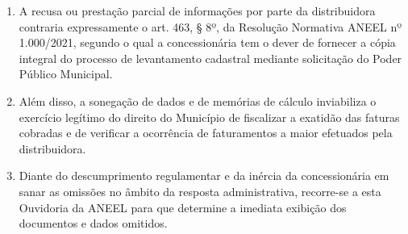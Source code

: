 \begin{enumerate}[resume]
\begin{itemize}
    \ifItemUltimoBaseGeorreferenciada\else
        \item \textbf{Último Censo – Base Georreferenciada:} Não fornecimento da base completa georreferenciada do último levantamento/recontagem conduzido pela distribuidora.
    \fi
    \ifItemUltimoTOI\else
        \item \textbf{Último Censo – Cópia de TOIs:} Ausência das cópias dos TOIs eventualmente lavrados em razão das apurações do último censo.
    \fi
    \ifItemUltimoMemorialCalculo\else
        \item \textbf{Último Censo – Memorial de Cálculo:} Omissão do memorial de cálculo do faturamento atualizado decorrente da última recontagem.
    \fi
    \ifItemUltimoDatasCenso\else
        \item \textbf{Último Censo – Período de Execução:} Falta de indicação do período exato (datas de início e término) de realização do último levantamento em campo.
    \fi
    \ifItemUltimoCartaComunicacao\else
        \item \textbf{Último Censo – Comunicação Prévia:} Não apresentação da notificação/comunicação oficial prévia encaminhada à Prefeitura sobre o último censo.
    \fi
    \ifItemUltimoCobrancaDevolucao\else
        \item \textbf{Último Censo – Informação Financeira:} Falta de posicionamento conclusivo sobre cobrança de diferenças ou devolução de montantes faturados a maior.
    \fi
    \ifItemUltimoComprovantes\else
        \item \textbf{Último Censo – Comprovantes Financeiros:} Não envio das faturas ou comprovantes bancários relativos aos acertos financeiros do último censo.
    \fi

    \ifItemTOIsVinculados\else
        \item \textbf{Histórico de TOIs (5 anos):} Negativa ou omissão na prestação de informações e envio de cópias integrais dos TOIs lavrados na Unidade Consumidora de Iluminação Pública nos últimos 5 (cinco) anos, bem como a discriminação dos respectivos comprovantes e parcelamentos.
    \fi
\end{itemize}

\item A recusa ou prestação parcial de informações por parte da distribuidora contraria expressamente o art. 463, § 8º, da Resolução Normativa ANEEL nº 1.000/2021, segundo o qual a concessionária tem o dever de fornecer a cópia integral do processo de levantamento cadastral mediante solicitação do Poder Público Municipal.

\item Além disso, a sonegação de dados e de memórias de cálculo inviabiliza o exercício legítimo do direito do Município de fiscalizar a exatidão das faturas cobradas e de verificar a ocorrência de faturamentos a maior efetuados pela distribuidora.

\item Diante do descumprimento regulamentar e da inércia da concessionária em sanar as omissões no âmbito da resposta administrativa, recorre-se a esta Ouvidoria da ANEEL para que determine a imediata exibição dos documentos e dados omitidos.
\end{enumerate}

